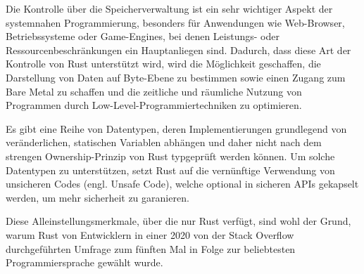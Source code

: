 Die Kontrolle über die Speicherverwaltung ist ein sehr wichtiger Aspekt der systemnahen Programmierung, besonders für Anwendungen wie Web-Browser, Betriebssysteme oder Game-Engines, bei denen Leistungs- oder Ressourcenbeschränkungen ein Hauptanliegen sind. Dadurch, dass diese Art der Kontrolle von Rust unterstützt wird, wird die Möglichkeit geschaffen, die Darstellung von Daten auf Byte-Ebene zu bestimmen sowie einen Zugang zum \glqq Bare Metal\grqq{} zu schaffen und die zeitliche und räumliche Nutzung von Programmen durch Low-Level-Programmiertechniken zu optimieren.


Es gibt eine Reihe von Datentypen, deren Implementierungen grundlegend von veränderlichen, statischen Variablen abhängen und daher nicht nach dem strengen Ownership-Prinzip von Rust typgeprüft werden können. Um solche Datentypen zu unterstützen, setzt Rust auf die vernünftige Verwendung von unsicheren Codes (engl. Unsafe Code), welche optional in sicheren APIs gekapselt werden, um mehr sicherheit zu garanieren.\autocite{unsafe-rust}

Diese Alleinstellungsmerkmale, über die nur Rust verfügt, sind wohl der Grund, warum Rust von Entwicklern in einer 2020 von der Stack Overflow durchgeführten Umfrage zum fünften Mal in Folge zur beliebtesten Programmiersprache gewählt wurde.\autocite{stack-overflow-rust-most-loved}\autocite{why-rust-so-loved}